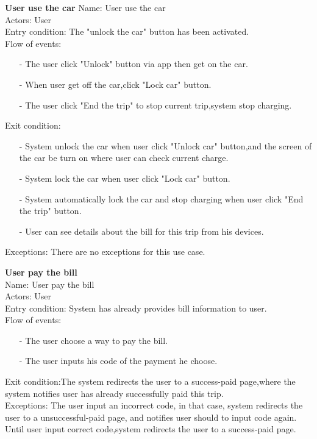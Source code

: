 \documentclass[12pt, letterpaper]{article}
\begin{document}
\textbf{User use the car}
Name: User use the car \\
Actors: User \\
Entry condition: The "unlock the car" button has been activated. \\
Flow of events: \\
\begin{itemize}
	\item[-] The user click "Unlock" button via app then get on the car.
	\item[-] When user get off the car,click "Lock car" button.
	\item[-] The user click "End the trip" to stop current trip,system stop charging.
\end{itemize} 
Exit condition: \\
\begin{itemize}
	\item[-] System unlock the car when user click "Unlock car" button,and the screen of the car be
	turn on where user can check current charge.
	\item[-] System lock the car when user click "Lock car" button.
	\item[-] System automatically lock the car and stop charging when user click "End the trip"
	button.
	\item[-] User can see details about the bill for this trip from his devices.
\end{itemize}
Exceptions: There are no exceptions for this use case. \\
\vspace{0.5cm}

\textbf{User pay the bill} \\
Name: User pay the bill \\
Actors: User \\
Entry condition: System has already provides bill information to user. \\
Flow of events: \\
\begin{itemize}
	\item[-] The user choose a way to pay the bill.
	\item[-] The user inputs his code of the payment he choose.
\end{itemize} 
Exit condition:The system redirects the user to a success-paid page,where the system notifies user has already successfully paid this trip. \\
Exceptions: The user input an incorrect code, in that case, system redirects the user to a unsuccessful-paid page, and notifies user should to input code again. Until user input correct code,system redirects the user to a success-paid page. \\
\end{document}
